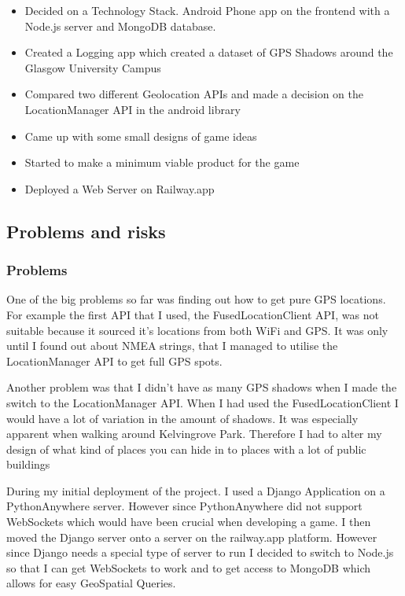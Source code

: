 \documentclass[11pt]{article}
\begin{document}
\begin{itemize}
    \tightlist
\item Decided on a Technology Stack. Android Phone app on the frontend with a Node.js server and MongoDB database. 
\item Created a Logging app which created a dataset of GPS Shadows around the Glasgow University Campus
\item Compared two different Geolocation APIs and made a decision on the LocationManager API in the android library
\item Came up with some small designs of game ideas
\item Started to make a minimum viable product for the game
\item Deployed a Web Server on Railway.app

\end{itemize}

\subsection{Problems and risks}\label{problems-and-risks}

\subsubsection{Problems}\label{problems}

One of the big problems so far was finding out how to get pure GPS locations. For example the first API that I used, the FusedLocationClient
API, was not suitable because it sourced it's locations from both WiFi and GPS. It was only until I found out about NMEA strings, that I managed
to utilise the LocationManager API to get full GPS spots.
\par
Another problem was that I didn't have as many GPS shadows when I made the switch to the LocationManager API. When I had used the FusedLocationClient
I would have a lot of variation in the amount of shadows. It was especially apparent when walking around Kelvingrove Park. Therefore I had to alter
my design of what kind of places you can hide in to places with a lot of public buildings
\par
During my initial deployment of the project. I used a Django Application on a PythonAnywhere server. However since PythonAnywhere did not support
WebSockets which would have been crucial when developing a game. I then moved the Django server onto a server on the railway.app platform. However
since Django needs a special type of server to run I decided to switch to Node.js so that I can get WebSockets to work and to get access to MongoDB
which allows for easy GeoSpatial Queries.
\end{document}

